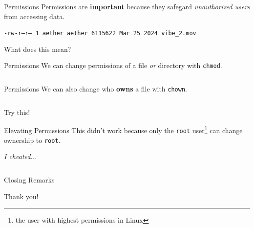 \documentclass{beamer}
\begin{document}
\begin{frame}{Permissions}
	Permissions are \textbf{important} because they safegard
	\textit{unauthorized users} from accessing data.
	\pause

	\vspace{0.3cm}

	\texttt{-rw-r--r-- 1 aether aether  6115622 Mar 25  2024 vibe\_2.mov}

	What does this mean?
\end{frame}

\begin{frame}{Permissions}
	We can change permissions of a file \textit{or} directory with \texttt{chmod}.
	\pause

	\tiny\inputminted{shell-session}{chmod.txt}
\end{frame}

\begin{frame}{Permissions}
	We can also change who \textbf{owns} a file with \texttt{chown}.
	\pause

	\tiny\inputminted{shell-session}{chown.txt}
	\pause

	\begin{center}
		\Large Try this!
	\end{center}
\end{frame}

\begin{frame}{Elevating Permissions}
	This didn't work because only the \texttt{root} user\footnote{the user
	with highest permissions in Linux} can change ownership to
	\texttt{root}.
	\pause

	\vspace{0.3cm}

	\textit{I cheated...}
	\pause

	\inputminted{shell-session}{sudo.txt}
\end{frame}

\begin{frame}{Closing Remarks}
	\begin{center}
		\Huge Thank you!
	\end{center}
\end{frame}
\end{document}

